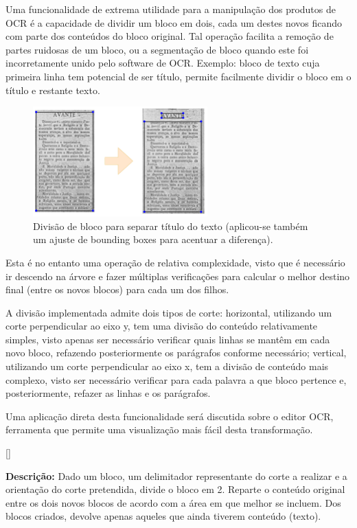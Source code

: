 Uma funcionalidade de extrema utilidade para a manipulação dos produtos de OCR é a capacidade de dividir um bloco em dois, cada um destes novos ficando com parte dos conteúdos do bloco original. Tal operação facilita a remoção de partes ruidosas de um bloco, ou a segmentação de bloco quando este foi incorretamente unido pelo software de OCR. Exemplo: bloco de texto cuja primeira linha tem potencial de ser título, permite facilmente dividir o bloco em o título e restante texto.

\begin{figure}[H]
	\centering
	\includegraphics[width=0.6\textwidth]{images/ilustracoes/split_blocks_example.png}
	\caption{Divisão de bloco para separar título do texto (aplicou-se também um ajuste de bounding boxes para acentuar a diferença).}
	\label{fig:split_blocks_example}
\end{figure}


Esta é no entanto uma operação de relativa complexidade, visto que é necessário ir descendo na árvore e fazer múltiplas verificações para calcular o melhor destino final (entre os novos blocos) para cada um dos filhos.

A divisão implementada admite dois tipos de corte: horizontal, utilizando um corte perpendicular ao eixo y, tem uma divisão do conteúdo relativamente simples, visto apenas ser necessário verificar quais linhas se mantêm em cada novo bloco, refazendo posteriormente os parágrafos conforme necessário; vertical, utilizando um corte perpendicular ao eixo x, tem a divisão de conteúdo mais complexo, visto ser necessário verificar para cada palavra a que bloco pertence e, posteriormente, refazer as linhas e os parágrafos. 

Uma aplicação direta desta funcionalidade será discutida sobre o editor OCR, ferramenta que permite uma visualização mais fácil desta transformação.


[\normalsize]

\textbf{Descrição:} Dado um bloco, um delimitador representante do corte a realizar e a orientação do corte pretendida, divide o bloco em 2. Reparte o conteúdo original entre os dois novos blocos de acordo com a área em que melhor se incluem. Dos blocos criados, devolve apenas aqueles que ainda tiverem conteúdo (texto).

